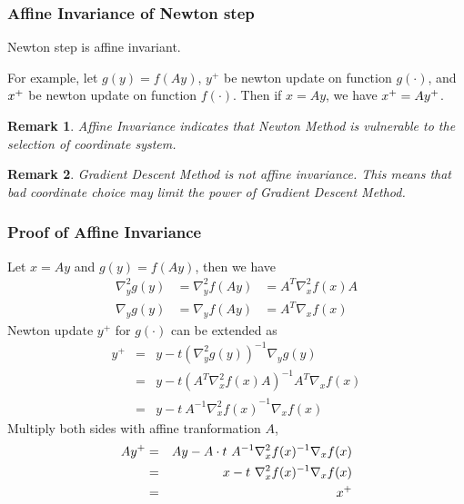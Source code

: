 \documentclass{beamer}
\newcommand{\be}{\begin{eqnarray}}
\newcommand{\ee}{\end{eqnarray}}
\newtheorem{remark}{Remark}
\begin{document}
%

\newcommand{\yp}{\ensuremath{y^{+}}}
\newcommand{\gradient}[3]{\ensuremath{\nabla_{#1} #2 (#3)}}
\newcommand{\hessian}[3]{\ensuremath{\nabla^2_{#1} #2 (#3)}}
\newcommand{\inv}{^{-1}}
\begin{frame}
\frametitle{Affine Invariance of Newton step}
\begin{lemma}
    Newton step is affine invariant. 
\end{lemma}

For example, let $g(y) = f(Ay)$, $\yp$ be newton update on function
$g(\cdot)$, and 
$x^{+}$ be newton update on function $f(\cdot)$. 
Then if $x=Ay$, we have $\xp = A\yp$.

\begin{remark}
    Affine Invariance indicates that Newton Method is vulnerable to the
    selection of coordinate system. 
\end{remark}
\begin{remark}
    Gradient Descent Method is not affine invariance. This means
    that bad coordinate choice may limit the power of Gradient Descent Method.
\end{remark}
\end{frame}

\begin{frame}
\frametitle{Proof of Affine Invariance}
    Let $x = Ay$ and $g(y) = f(Ay)$, then we have
    \be
    \hessian{y}{g}{y} &= \hessian{y}{f}{Ay} &= A^T \hessian{x}{f}{x} A \\
    \gradient{y}{g}{y} &= \gradient{y}{f}{Ay} &= A^T \gradient{x}{f}{x}
    \ee
    Newton update $\yp$ for $g(\cdot)$ can be extended as
    \be
    \yp &=& y - t(\hessian{y}{g}{y})\inv \gradient{y}{g}{y} \\
    &=& y - t(A^T \hessian{x}{f}{x} A)\inv A^T \gradient{x}{f}{x} \\
    &=& y - t\ A\inv \hessian{x}{f}{x}\inv \gradient{x}{f}{x}
    \ee
    Multiply both sides with affine tranformation $A$, 
    \be
    A\yp &=& Ay - A \cdot t\ A\inv \hessian{x}{f}{x}\inv \gradient{x}{f}{x} \\
    &=& x - t\ \hessian{x}{f}{x}\inv \gradient{x}{f}{x} \\
    &=& \xp
    \ee
\end{frame}
\end{document}
